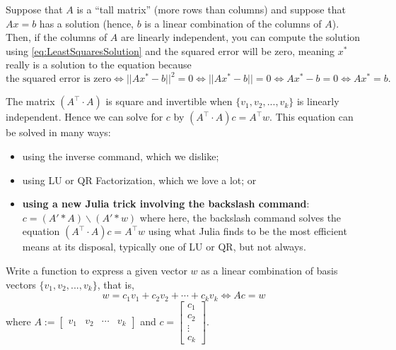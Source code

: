 \vspace*{.2cm}

\begin{tcolorbox}[title=\textbf{\large Useful Remark for Solving Tall Linear Equations}] Suppose that $A$ is a ``tall matrix'' (more rows than columns) and suppose that $Ax=b$ has a solution (hence, $b$ is a linear combination of the columns of $A$). Then, if the columns of $A$ are linearly independent, you can compute the solution using \eqref{eq:LeastSquaresSolution} and the squared error will be zero, meaning $x^\ast$ really is a solution to the equation because $$\text{the squared error is zero} \iff ||A x^\ast - b||^2 = 0 \iff ||A x^\ast - b|| = 0 \iff A x^\ast - b=0 \iff A x^\ast = b.$$ 
\end{tcolorbox}


\vspace*{.2cm}



\begin{rem}
The matrix $(A^\top \cdot A)$ is square and invertible when $\{v_1, v_2, ..., v_k\}$ is linearly independent. Hence we can solve for $c$ by $(A^\top \cdot A) c = A^\top w$. This equation can be solved in many ways: 
\begin{itemize}
    \item using the inverse command, which we dislike; 
    \item using LU or QR Factorization, which we love a lot; or 
    \item \textbf{using a new Julia trick involving the backslash command}: $c = (A'*A)\backslash (A'*w)$ where here, the backslash command solves the equation $(A^\top \cdot A) c = A^\top w$ using what Julia finds to be the most efficient means at its disposal, typically one of LU or QR, but not always.
\end{itemize}
\end{rem}

\vspace*{.2cm}

\begin{exercise} Write a function to express a given vector $w$ as a linear combination of basis vectors $\{v_1, v_2, ..., v_k\}$, that is,
$$w = c_1 v_1 + c_2 v_2 + \cdots + c_k v_k \iff A c = w $$
where $A:=\begin{bmatrix} v_1 & v_2 & \cdots & v_k\end{bmatrix}$ and $c = \begin{bmatrix} c_1\\ c_2 \\ \vdots \\c_k\end{bmatrix}$.
\end{exercise}

